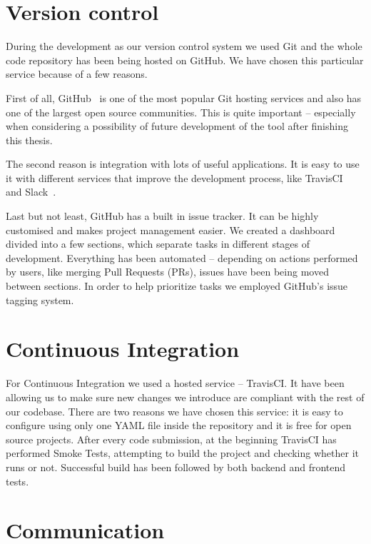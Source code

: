 \documentclass[licencjacka,en]{thesisclass}
\begin{document}
    \section{Version control}

    During the development as our version control system we used Git
    and the whole code repository has been being hosted on GitHub.
    We have chosen this particular service because of a few reasons.

    First of all, GitHub~\cite{GitHub} is one of the most popular Git hosting services
    and also has one of the largest open source communities.
    This is quite important -- especially when considering a possibility of
    future development of the tool after finishing this thesis.

    The second reason is integration with lots of useful applications.
    It is easy to use it with different services that improve the development
    process, like TravisCI~\cite{TravisCI} and Slack~\cite{Slack}.

    Last but not least, GitHub has a built in issue tracker.
    It can be highly customised and makes project management easier.
    We created a dashboard divided into a few sections, which separate tasks
    in different stages of development.
    Everything has been automated -- depending on actions performed by users,
    like merging Pull Requests (PRs), issues have been being moved between sections.
    In order to help prioritize tasks we employed GitHub's issue tagging system.

    \section{Continuous Integration}

    For Continuous Integration we used a hosted service -- TravisCI.
    It have been allowing us to make sure new changes we introduce
    are compliant with the rest of our codebase.
    There are two reasons we have chosen this service:
    it is easy to configure using only one YAML file
    inside the repository and it is free for open source projects.
    After every code submission, at the beginning TravisCI
    has performed Smoke Tests, attempting to build the project
    and checking whether it runs or not.
    Successful build has been followed by both backend and frontend tests.

    \section{Communication}
\end{document}
